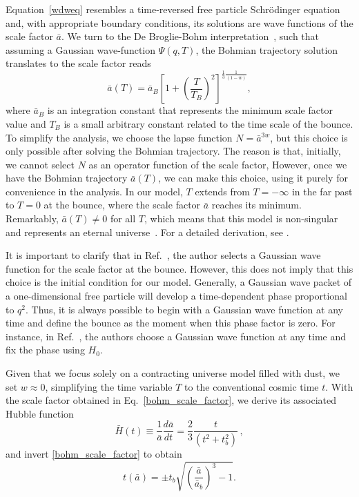 \documentclass[a4paper,11pt]{article}
\newcommand{\dpar}[1]{\left(#1 \right)}
\newcommand{\dcol}[1]{\left[#1 \right]}
\begin{document}
Equation~\eqref{wdweq} resembles a time-reversed free particle Schrödinger equation and,
with appropriate boundary conditions, its solutions are wave functions of the scale
factor $\bar{a}$. We turn to the De Broglie-Bohm
interpretation~\cite{mukhanov2005physical, nelson2000bohm}, such that assuming a Gaussian
wave-function $\Psi(q, T)$, the Bohmian trajectory solution translates to the scale
factor reads
\begin{equation}
	\label{bohm_scale_factor}
	\bar{a}(T) = \bar{a}_{B}\dcol{1 + \dpar{ \frac{T}{T_{ B}} }^2 }^{{\frac{1}{3}\frac{1}{\dpar{1-w}} } }  ,
\end{equation}
where $\bar{a}_{B}$ is an integration constant that represents the minimum scale factor
value and $T_B$ is a small arbitrary constant related to the time scale of the bounce.
	{\color{red} To simplify the analysis, we choose the lapse function $N = \bar{a}^{3w}$,
		but this choice is only possible after solving the Bohmian trajectory. The reason is
		that, initially, we cannot select $N$ as an operator function of the scale factor,
		However, once we have the Bohmian trajectory $\bar{a}(T)$, we can make this choice,
		using it purely for convenience in the analysis. In our model, $T$ extends from $T =
			-\infty$ in the far past to $T = 0$ at the bounce, where the scale factor $\bar{a}$
		reaches its minimum. } Remarkably, $\bar{a}(T) \neq 0$ for all $T$, which means that
this model is non-singular and represents an eternal
universe~\cite{nelson_peter_bouncing_original}. For a detailed derivation, see
\cite{nelson2021bouncing}.

{\color{red} It is important to clarify that in Ref.~\cite{nelson2021bouncing}, the
author selects a Gaussian wave function for the scale factor at the bounce. However,
this does not imply that this choice is the initial condition for our model. Generally,
a Gaussian wave packet of a one-dimensional free particle will develop a time-dependent
phase proportional to $q^2$. Thus, it is always possible to begin with a Gaussian wave
function at any time and define the bounce as the moment when this phase factor is zero.
For instance, in Ref.~\cite{Peter2016a}, the authors choose a Gaussian wave function at
any time and fix the phase using $H_0$. }

Given that we focus solely on a contracting universe model filled with dust, we set $w
	\approx 0$, simplifying the time variable $T$ to the conventional cosmic time $t$. With
the scale factor obtained in Eq.~\eqref{bohm_scale_factor}, we derive its associated
Hubble function
\begin{equation}\label{bohm_hubble}
	\bar{H}(t) \equiv \frac{1}{\bar{a}}\frac{d\bar{a}}{dt} = \frac{2}{3}\frac{t}{ \dpar{ t^{2} + t^{2}_{b} } }\, ,
\end{equation}
and invert \eqref{bohm_scale_factor} to obtain
\begin{equation}\label{bohm_time}
	t(\bar{a}) = \pm t_{b}\sqrt{ \dpar{\frac{\bar{a}}{\bar{a}_{b}}}^{3} - 1 } .
\end{equation}
\end{document}

